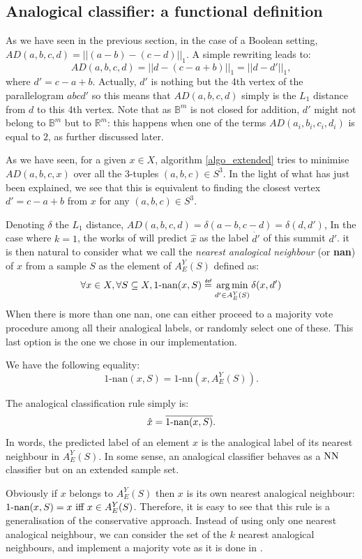 \subsection{Analogical classifier: a functional definition}\label{FUNCTIONAL_DEF}

As we have seen in the previous section, in the case of a Boolean setting,
$AD(a,b,c,d)= ||(a-b)-(c-d)||_1$.  A simple rewriting leads to:
$$AD(a,b,c,d)=||d - (c-a+b)||_1=||d - d'||_1,$$
where $d'=c-a+b$. Actually, $d'$ is nothing but the 4th vertex of the
parallelogram $abcd'$ so this means that $AD(a,b,c,d)$ simply is the $L_1$ distance
 from $d$ to this 4th vertex. Note that as $\mathbb{B}^m$ is not closed for
addition, $d'$ might not belong to $\mathbb{B}^m$ but to $\mathbb{R}^m$: this
happens when one of the terms $AD(a_i, b_i, c_i, d_i)$ is equal to $2$, as
further discussed later.

As we have seen, for a given $x \in X$, algorithm \ref{algo_extended} tries to
minimise $AD(a,b,c,x)$ over all the 3-tuples $(a,b,c) \in S^3$. In the
light of what has just been explained, we see that this is equivalent to
finding the closest vertex $d'=c-a+b$  from $x$ for any $(a, b, c) \in S^3$.


Denoting $\delta$ the $L_1$ distance, $AD(a,b,c,d) =\delta(a-b,c-d) =
\delta(d,d')$,
In the case where $k=1$, the
works of \cite{BayMicDelIJCAI07} will predict $\hat{x}$ as the label $\dot{d'}$ of
this summit $d'$. 
it is then natural to consider what we call the \textit{nearest analogical
neighbour} (or \textbf{nan}) of $x$ from a sample $S$ as the element of
$A_E^Y(S)$ defined as:
$$\forall x \in X, \forall S \subseteq X, 1\mbox{-nan}(x,S)\eqdef \argmin_{d'
\in A_E^Y(S)} \delta(x,d')$$
When there is more than one nan, one can either proceed to a majority vote
procedure among all their analogical labels, or randomly select one of these.
This last option is the one we chose in our implementation.
\begin{property} \label{propnn}We have the following equality:
$$1\mbox{-nan}(x,S)= 1\mbox{-nn}(x,A_E^Y(S)).$$
\end{property}
The analogical classification rule simply is:
$$\hat{x} = \overline{1\mbox{-nan}(x,S)}.$$
In words, the predicted label of an element $x$ is the analogical label of its
nearest neighbour in $A_E^Y(S)$.
In some sense, an analogical classifier behaves
as a $\mbox{NN}$ classifier but on an extended sample set.

Obviously if $x$ belongs to $A_E^Y(S)$ then $x$ is its own nearest analogical
neighbour: $1\mbox{-nan}(x, S) = x \text{ iff } x \in A_E^Y(S)$. Therefore, it is easy
to see that this rule is a generalisation of the conservative approach.
Instead of using only one nearest analogical neighbour, we can consider the set
of the $k$ nearest analogical neighbours, and implement a majority vote as it is
done in \cite{MicBayDelJAIR08}.

